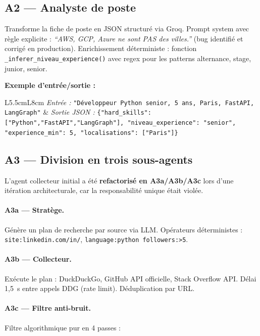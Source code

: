 \documentclass[12pt,a4paper]{report}
\begin{document}
\subsection{A2 --- Analyste de poste}

Transforme la fiche de poste en JSON structuré via Groq. Prompt system avec
règle explicite : \textit{``AWS, GCP, Azure ne sont PAS des villes.''} (bug
identifié et corrigé en production). Enrichissement déterministe : fonction
\texttt{\_inferer\_niveau\_experience()} avec regex pour les patterns alternance,
stage, junior, senior.

\textbf{Exemple d'entrée/sortie :}

\medskip
\begin{tabularx}{\textwidth}{L{5.5cm}L{8cm}}
\textit{Entrée :} \texttt{"Développeur Python senior, 5 ans, Paris, FastAPI, LangGraph"} &
\textit{Sortie JSON :} \texttt{\{"hard\_skills": ["Python","FastAPI","LangGraph"], "niveau\_experience": "senior", "experience\_min": 5, "localisations": ["Paris"]\}} \\
\end{tabularx}

\subsection{A3 --- Division en trois sous-agents}

L'agent collecteur initial a été \textbf{refactorisé en A3a/A3b/A3c} lors d'une
itération architecturale, car la responsabilité unique était violée.

\paragraph{A3a --- Stratège.} Génère un plan de recherche par source via LLM.
Opérateurs déterministes : \texttt{site:linkedin.com/in/}, \texttt{language:python
followers:>5}.

\paragraph{A3b --- Collecteur.} Exécute le plan : DuckDuckGo, GitHub API officielle,
Stack Overflow API. Délai 1,5~s entre appels DDG (rate limit). Déduplication par URL.

\paragraph{A3c --- Filtre anti-bruit.} Filtre algorithmique pur en 4 passes :
\end{document}
